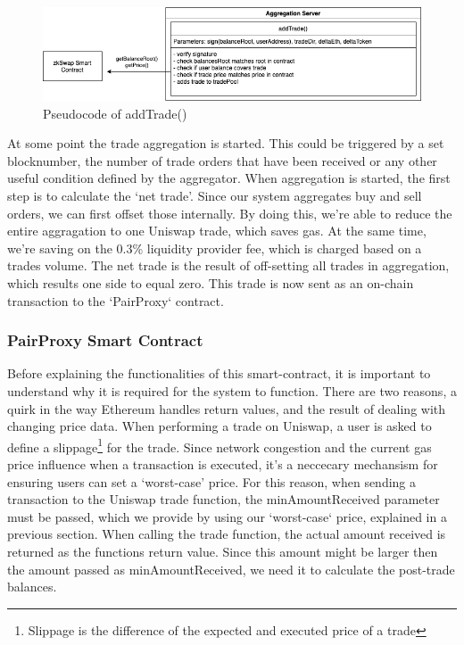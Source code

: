 \documentclass[../../thesis.tex]{subfiles}
\begin{document}
\begin{figure}[h]
    \centerline{\includegraphics[totalheight=3cm]{diagrams/addTrade.png}}
    \caption{Pseudocode of addTrade()}
    \label{fig:addTrade}
\end{figure}

At some point the trade aggregation is started. This could be triggered by a set blocknumber, the number of trade orders that have been received or any other useful condition defined by the aggregator. When aggregation is started, the first step is to calculate the `net trade'. Since our system aggregates buy and sell orders, we can first offset those internally. By doing this, we're able to reduce the entire aggragation to one Uniswap trade, which saves gas. At the same time, we're saving on the 0.3\% liquidity provider fee, which is charged based on a trades volume. The net trade is the result of off-setting all trades in aggregation, which results one side to equal zero. This trade is now sent as an on-chain transaction to the `PairProxy` contract. 

\subsubsection{PairProxy Smart Contract} \label{pairProxy}
Before explaining the functionalities of this smart-contract, it is important to understand why it is required for the system to function. There are two reasons, a quirk in the way Ethereum handles return values, and the result of dealing with changing price data.
When performing a trade on Uniswap, a user is asked to define a slippage\footnote{Slippage is the difference of the expected and executed price of a trade} for the trade. Since network congestion and the current gas price influence when a transaction is executed, it's a neccecary mechansism for ensuring users can set a `worst-case' price. For this reason, when sending a transaction to the Uniswap trade function, the minAmountReceived parameter must be passed, which we provide by using our `worst-case` price, explained in a previous section. When calling the trade function, the actual amount received is returned as the functions return value. Since this amount might be larger then the amount passed as minAmountReceived, we need it to calculate the post-trade balances. 
\end{document}
